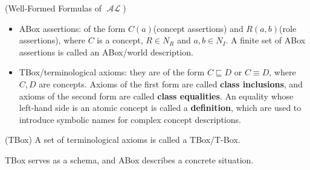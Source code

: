 \documentclass{article}
\DeclareMathOperator{\al}{\mathcal{AL}}
\begin{document}
\begin{defin}(Well-Formed Formulas of $\al$)
\begin{itemize}
\item ABox assertions: of the form $C(a)$(concept assertions) and $R(a,b)$(role assertions), where $C$ is a concept, $R \in N_R$ and $a,b \in N_I$. A finite set of  ABox assertions is called an ABox/world description.
\item TBox/terminological axioms: they are of the form $C \sqsubseteq D$ or $C \equiv D$,
where $C, D$ are concepts. Axioms of the first form are called \textbf{class inclusions}, and axioms of the second form are called \textbf{class equalities}. An equality whose left-hand side is an atomic concept is called a \textbf{definition}, which are used to introduce symbolic names for complex concept descriptions. 
\end{itemize}
\end{defin}

\begin{defin}(TBox)\newline
A set of terminological axioms is called a TBox/T-Box.
\end{defin}
TBox serves as a schema, and ABox describes a concrete situation.
\end{document}
